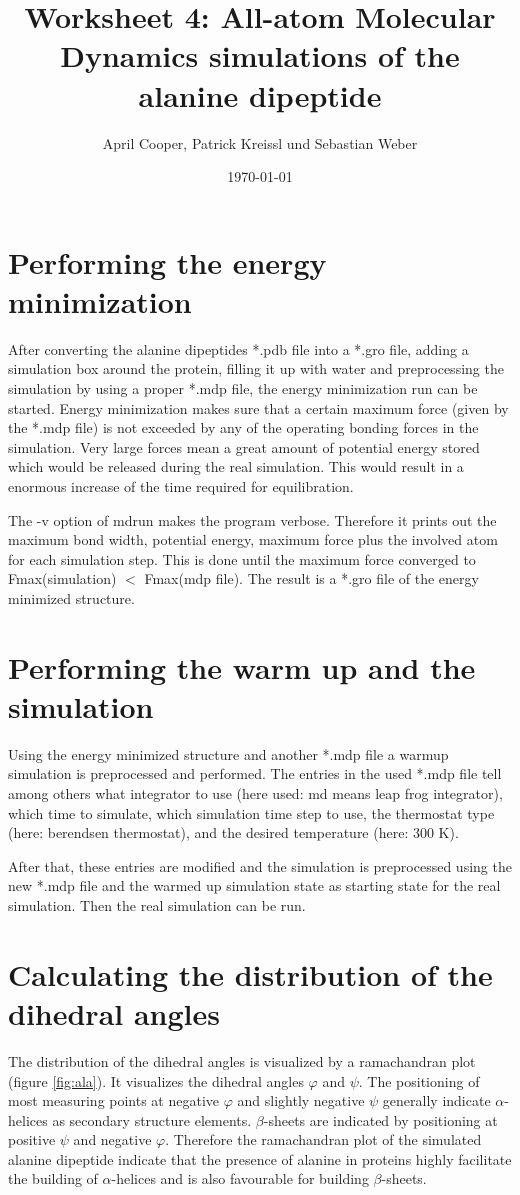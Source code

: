 \documentclass[12pt,a4paper]{scrartcl}
\author{April Cooper, Patrick Kreissl und Sebastian Weber}
\title{Worksheet 4: All-atom Molecular Dynamics simulations
of the alanine dipeptide}
\date{\today}
\begin{document}
\maketitle
\tableofcontents
\newpage

\section{Performing the energy minimization}
After converting the alanine dipeptides *.pdb file into a *.gro file, adding a simulation box around the protein, filling it up with water and preprocessing the simulation by using a proper *.mdp file, the energy minimization run can be started. Energy minimization makes sure that a certain maximum force (given by the *.mdp file) is not exceeded by any of the operating bonding forces in the simulation. Very large forces mean a great amount of potential energy stored which would be released during the real simulation. This would result in a enormous increase of the time required for equilibration.

The -v option of mdrun makes the program verbose. Therefore it prints out the maximum bond width, potential energy, maximum force plus the involved atom for each simulation step. This is done until the maximum force converged to Fmax(simulation) $<$ Fmax(mdp file). The result is a *.gro file of the energy minimized structure.

\section{Performing the warm up and the simulation}
Using the energy minimized structure and another *.mdp file a warmup simulation is preprocessed and performed. The entries in the used *.mdp file tell among others what integrator to use (here used: md means leap frog integrator), which time to simulate, which simulation time step to use, the thermostat type (here: berendsen thermostat), and the desired temperature (here: 300 K).

After that, these entries are modified and the simulation is preprocessed using the new *.mdp file and the warmed up simulation state as starting state for the real simulation. Then the real simulation can be run.

\section{Calculating the distribution of the dihedral angles}
The distribution of the dihedral angles is visualized by a ramachandran plot (figure \ref{fig:ala}). It visualizes the dihedral angles $\varphi$ and $\psi$. The positioning of most measuring points at negative $\varphi$ and slightly negative $\psi$ generally indicate $\alpha$-helices as secondary structure elements. $\beta$-sheets are indicated by positioning at positive $\psi$ and negative $\varphi$. Therefore the ramachandran plot of the simulated alanine dipeptide indicate that the presence of alanine in proteins highly facilitate the building of $\alpha$-helices and is also favourable for building  $\beta$-sheets. 
\end{document}
